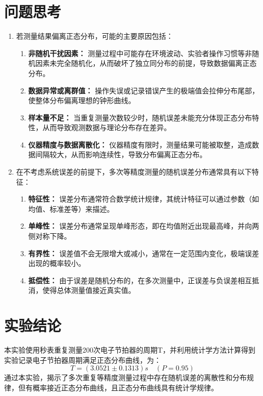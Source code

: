 \documentclass[12pt,a4paper]{article}
\begin{document}
	\section{问题思考}
	\begin{enumerate}[leftmargin=2em, label=\arabic*.]
		\item 若测量结果偏离正态分布，可能的主要原因包括：
		\begin{enumerate}[label=(\alph*)]
			\item \textbf{非随机干扰因素：} 测量过程中可能存在环境波动、实验者操作习惯等非随机因素未完全随机化，从而破坏了独立同分布的前提，导致数据偏离正态分布。
			\item \textbf{数据异常或离群值：} 操作失误或记录错误产生的极端值会拉伸分布尾部，使整体分布偏离理想的钟形曲线。
			\item \textbf{样本量不足：} 当重复测量次数较少时，随机误差未能充分体现正态分布特性，从而导致观测数据与理论分布存在差异。
			\item \textbf{仪器精度与数据离散化：} 仪器精度有限时，测量结果可能被取整，造成数据间隔较大，从而影响连续性，导致分布偏离正态分布。
		\end{enumerate}
	
		\item 在不考虑系统误差的前提下，多次等精度测量的随机误差分布通常具有以下特征：
		\begin{enumerate}[label=(\alph*)]
			\item \textbf{特征性：} 误差分布通常符合数学统计规律，其统计特征可以通过参数（如均值、标准差等）来描述。
			\item \textbf{单峰性：} 误差分布通常呈现单峰形态，即在均值附近出现最高峰，并向两侧对称下降。
			\item \textbf{有界性：} 误差值不会无限增大或减小，通常在一定范围内变化，极端误差出现的概率较小。
			\item \textbf{抵偿性：} 由于误差是随机分布的，在多次测量中，正误差与负误差相互抵消，使得总体测量值接近真实值。
		\end{enumerate}
	\end{enumerate}
	
	\section{实验结论}
	本实验使用秒表重复测量200次电子节拍器的周期T，并利用统计学方法计算得到实验记录电子节拍器周期满足正态分布曲线，为：
	$$T=(3.0521\pm0.1313)s\quad(P=0.95)$$
	通过本实验，揭示了多次重复等精度测量过程中存在随机误差的离散性和分布规律，但有概率接近正态分布曲线，且正态分布曲线具有统计学规律。

	
\end{document}
